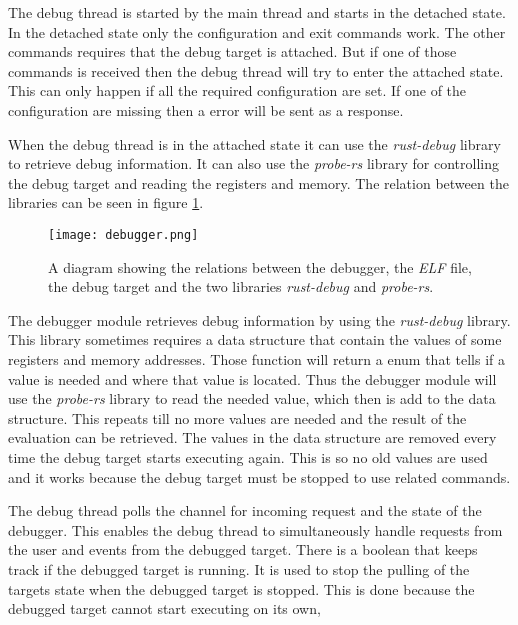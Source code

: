 The debug thread is started by the main thread and starts in the detached state.
In the detached state only the configuration and exit commands work.
The other commands requires that the debug target is attached.
But if one of those commands is received then the debug thread will try to enter the attached state.
This can only happen if all the required configuration are set.
If one of the configuration are missing then a error will be sent as a response.


When the debug thread is in the attached state it can use the \emph{rust-debug} library to retrieve debug information.
It can also use the \emph{probe-rs} library for controlling the debug target and reading the registers and memory.
The relation between the libraries can be seen in figure \ref{fig:debugger}.


\begin{figure}[h]
	\centering
	\texttt{[image: debugger.png]}
	\caption{A diagram showing the relations between the debugger, the \emph{ELF} file, the debug target and the two libraries \emph{rust-debug} and \emph{probe-rs}.}
	\label{fig:debugger}
\end{figure}


The debugger module retrieves debug information by using the \emph{rust-debug} library.
This library sometimes requires a data structure that contain the values of some registers and memory addresses.
Those function will return a enum that tells if a value is needed and where that value is located.
Thus the debugger module will use the \emph{probe-rs} library to read the needed value, which then is  add to the data structure.
This repeats till no more values are needed and the result of the evaluation can be retrieved.
The values in the data structure are removed every time the debug target starts executing again.
This is so no old values are used and it works because the debug target must be stopped to use related commands.



The debug thread polls the channel for incoming request and the state of the debugger.
This enables the debug thread to simultaneously handle requests from the user and events from the debugged target.
There is a boolean that keeps track if the debugged target is running.
It is used to stop the pulling of the targets state when the debugged target is stopped.
This is done because the debugged target cannot start executing on its own,


